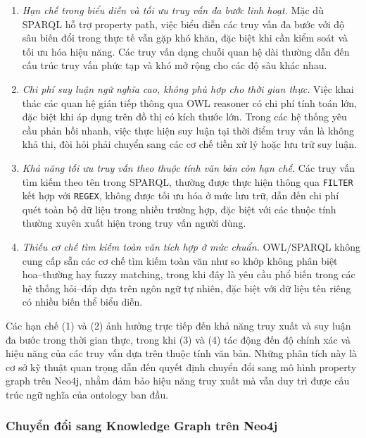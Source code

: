 \begin{enumerate}
\item \textit{Hạn chế trong biểu diễn và tối ưu truy vấn đa bước linh hoạt.}
Mặc dù SPARQL hỗ trợ property path, việc biểu diễn các truy vấn đa bước với độ sâu biến đổi trong thực tế vẫn gặp khó khăn, đặc biệt khi cần kiểm soát và tối ưu hóa hiệu năng. Các truy vấn dạng chuỗi quan hệ dài thường dẫn đến cấu trúc truy vấn phức tạp và khó mở rộng cho các độ sâu khác nhau.

\item \textit{Chi phí suy luận ngữ nghĩa cao, không phù hợp cho thời gian thực.}
Việc khai thác các quan hệ gián tiếp thông qua OWL reasoner có chi phí tính toán lớn, đặc biệt khi áp dụng trên đồ thị có kích thước lớn. Trong các hệ thống yêu cầu phản hồi nhanh, việc thực hiện suy luận tại thời điểm truy vấn là không khả thi, đòi hỏi phải chuyển sang các cơ chế tiền xử lý hoặc lưu trữ suy luận.

\item \textit{Khả năng tối ưu truy vấn theo thuộc tính văn bản còn hạn chế.}
Các truy vấn tìm kiếm theo tên trong SPARQL, thường được thực hiện thông qua \texttt{FILTER} kết hợp với \texttt{REGEX}, không được tối ưu hóa ở mức lưu trữ, dẫn đến chi phí quét toàn bộ dữ liệu trong nhiều trường hợp, đặc biệt với các thuộc tính thường xuyên xuất hiện trong truy vấn người dùng.

\item \textit{Thiếu cơ chế tìm kiếm toàn văn tích hợp ở mức chuẩn.}
OWL/SPARQL không cung cấp sẵn các cơ chế tìm kiếm toàn văn như so khớp không phân biệt hoa–thường hay fuzzy matching, trong khi đây là yêu cầu phổ biến trong các hệ thống hỏi–đáp dựa trên ngôn ngữ tự nhiên, đặc biệt với dữ liệu tên riêng có nhiều biến thể biểu diễn.
\end{enumerate}

Các hạn chế (1) và (2) ảnh hưởng trực tiếp đến khả năng truy xuất và suy luận đa bước trong thời gian thực, trong khi (3) và (4) tác động đến độ chính xác và hiệu năng của các truy vấn dựa trên thuộc tính văn bản. Những phân tích này là cơ sở kỹ thuật quan trọng dẫn đến quyết định chuyển đổi sang mô hình property graph trên Neo4j, nhằm đảm bảo hiệu năng truy xuất mà vẫn duy trì được cấu trúc ngữ nghĩa của ontology ban đầu.

\subsubsection{Chuyển đổi sang Knowledge Graph trên Neo4j}

